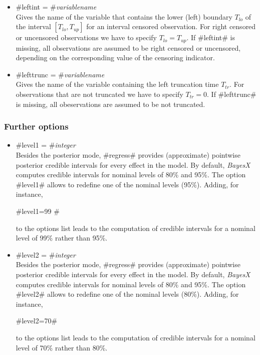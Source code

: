 \begin{itemize}
\item #leftint = #{\em variablename}\\
Gives the name of the variable that contains the lower (left)
boundary $T_{lo}$ of the interval $[T_{lo},T_{up}]$ for an interval
censored observation. For right censored or uncensored observations
we have to specify $T_{lo}=T_{up}$. If #leftint# is missing, all
observations are assumed to be right censored or uncensored,
depending on the corresponding value of the censoring indicator.

\item #lefttrunc = #{\em variablename}\\
Gives the name of the variable containing the left truncation time
$T_{tr}$. For observations that are not truncated we have to specify
$T_{tr}=0$. If #lefttrunc# is missing, all obeservations are assumed
to be not truncated.
\end{itemize}

\subsubsection*{Further options} \label{remlreg_further_options}

  
\begin{itemize}
\item \label{remlreglevel1} #level1 = #{\em integer} \\
Besides the posterior mode, #regress# provides (approximate)
pointwise posterior credible intervals for every effect in the
model. By default, {\em BayesX} computes credible intervals for
nominal levels of 80\% and 95\%. The option #level1# allows to
redefine one of the nominal levels (95\%). Adding, for instance,

#level1=99 #

to the options list leads to the computation of credible intervals
for a nominal level of 99\% rather than 95\%.
\item \label{remlreglevel2} #level2 = #{\em integer} \\
Besides the posterior mode, #regress# provides (approximate)
pointwise posterior credible intervals for every effect in the
model. By default, {\em BayesX} computes credible intervals for
nominal levels of 80\% and 95\%. The option #level2# allows to
redefine one of the nominal levels (80\%). Adding, for instance,

#level2=70#

to the options list leads to the computation of credible intervals
for a nominal level of 70\% rather than 80\%.
\end{itemize}

